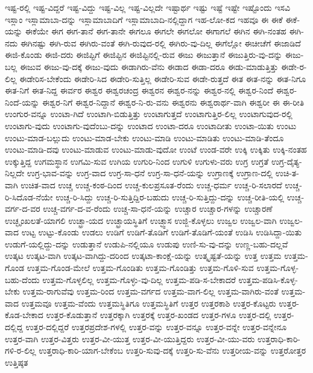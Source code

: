 {ಇಷ್ಟ-ರಲ್ಲಿ
ಇಷ್ಟ-ವಿದ್ದರೆ
ಇಷ್ಟ-ವಿದ್ದು
ಇಷ್ಟ-ವಿಲ್ಲ
ಇಷ್ಟ-ವಿಲ್ಲದೇ
ಇಷ್ಟಾರ್ಥ
ಇಷ್ಟು
ಇಷ್ಟೆ
ಇಷ್ಟೇ
ಇಷ್ಟೊಂದು
ಇಸವಿ
ಇಸ್ಲಾಂ
ಇಸ್ಲಾಮಾಬಾ-ದನ್ನು
ಇಸ್ಲಾಮಾಬಾದಿಗೆ
ಇಸ್ಲಾಮಾಬಾದಿ-ನಲ್ಲಿದ್ದಾಗ
ಇಹ-ಲೋ-ಕದ
ಇಹವೂ
ಈ
ಈಕೆ
ಈಕೆ-ಯನ್ನು
ಈಕೆಯೇ
ಈಗ
ಈಗ-ತಾನೆ
ಈಗ-ತಾನೇ
ಈಗಲೂ
ಈಗಲೇ
ಈಗಲೋ
ಈಗಾಗಲೆ
ಈಗಿನ
ಈಗಿ-ನಂತಹ
ಈಗಿ-ನದು
ಈಗಿನಷ್ಟು
ಈಗಿ-ರುವ
ಈಗಿರು-ವಂತೆ
ಈಗಿ-ರುವುದ-ರಲ್ಲಿ
ಈಗಿರು-ವು-ದಿಲ್ಲ
ಈಗೆಲ್ಲೋ
ಈಚೀಚೆಗೆ
ಈಜಾಡಿದೆ
ಈಜಿ-ಕೊಂಡು
ಈಜಿ-ದರು
ಈಜಿಪ್ಟಿಗೆ
ಈಜಿಪ್ಟಿನ
ಈಜಿಪ್ಟಿನಲ್ಲಿ-ರುವ
ಈಜು
ಈಜುತ್ತಾನೆ
ಈಜುತ್ತಿರು-ವು-ದನ್ನು
ಈಜು-ಬಲ್ಲ
ಈಜುವ
ಈಜು-ವು-ದಕ್ಕೆ
ಈಜು-ವುದು
ಈಡಾಗಿರು-ವೆನು
ಈಡಾದ
ಈಡಾ-ದರೂ
ಈಡು-ಮಾಡುತ್ತಿತ್ತು
ಈಡೇ-ರ-ಲಿಲ್ಲ
ಈಡೇರಿಸ-ಬೇಕೆಂದು
ಈಡೇರಿ-ಸಿದ
ಈಡೇರಿ-ಸುತ್ತಿಲ್ಲ
ಈಡೇರಿ-ಸುವ
ಈಡೇ-ರುತ್ತದೆ
ಈತ
ಈತ-ನನ್ನು
ಈತ-ನಿಗೂ
ಈತ-ನಿಗೆ
ಈತ-ನಿದ್ದ
ಈರ್ವರ
ಈಶ್ವರ
ಈಶ್ವರಚಂದ್ರ
ಈಶ್ವರನ
ಈಶ್ವರ-ನನ್ನು
ಈಶ್ವರ-ನಲ್ಲಿ
ಈಶ್ವರ-ನಿಂದೆ
ಈಶ್ವರ-ನಿಂದೆ-ಯನ್ನು
ಈಶ್ವರ-ನಿಗೆ
ಈಶ್ವರ-ನಿದ್ದಾನೆ
ಈಶ್ವರ-ನಿ-ರು-ವನು
ಈಶ್ವರನು
ಈಶ್ವರಾರ್ಥ-ವಾಗಿ
ಈಶ್ವರೀ
ಈ
ಈ-ರೀತಿ
ಉಂಗುರ-ವನ್ನೂ
ಉಂಟಾ-ಗಿದೆ
ಉಂಟಾಗಿ-ಬಿಡುತ್ತಿತ್ತು
ಉಂಟಾಗುತ್ತದೆ
ಉಂಟಾಗುತ್ತಿರ-ಲಿಲ್ಲ
ಉಂಟಾಗುವುದ-ರಲ್ಲಿ
ಉಂಟಾಗು-ವುದು
ಉಂಟಾಗು-ವುದೆಂಬು-ದನ್ನು
ಉಂಟಾದ
ಉಂಟಾ-ದರೂ
ಉಂಟಾದೀತು
ಉಂಟಾ-ಯಿತು
ಉಂಟು
ಉಂಟು-ಮಾಡ-ಬಲ್ಲುದು
ಉಂಟು-ಮಾಡ-ಬೇಕು
ಉಂಟು-ಮಾಡಿ
ಉಂಟು-ಮಾಡಿತು
ಉಂಟು-ಮಾಡಿ-ತೆಂದೂ
ಉಂಟು-ಮಾಡಿ-ದವು
ಉಂಟು-ಮಾಡುವ
ಉಂಟು-ಮಾಡು-ವುದೋ
ಉಂಟೆ
ಉಂಡ-ವರೇ
ಉಕ್ಕಿ
ಉಕ್ಕಿತು
ಉಕ್ಕಿ-ನಂತಹ
ಉಕ್ಕುತ್ತಿದ್ದ
ಉಗಮಸ್ಥಾನ
ಉಗಮಿ-ಸುವ
ಉಗಿಯ
ಉಗುರಿ-ನಿಂದ
ಉಗುಳಿ
ಉಗುಳು-ವರು
ಉಗ್ರ
ಉಗ್ರತೆ
ಉಗ್ರ-ದೈತ್ಯ-ನಿಲ್ಲದೇ
ಉಗ್ರ-ಭಾವ-ವನ್ನು
ಉಗ್ರ-ವಾದ
ಉಗ್ರ-ಸಾ-ಧನೆ
ಉಗ್ರ-ಸಾ-ಧನೆ-ಯನ್ನು
ಉಗ್ರಾಣಕ್ಕೆ
ಉಗ್ರಾಣ-ದಲ್ಲಿ
ಉಚಿ-ತ-ವಾಗಿ
ಉಚಿತ-ವಾದ
ಉಚ್ಚ
ಉಚ್ಚ-ಕಂಠ-ದಿಂದ
ಉಚ್ಚ-ಕುಲಪ್ರಸೂತ-ರೆಂದು
ಉಚ್ಚ-ಧರ್ಮ
ಉಚ್ಚ-ರಿ-ಸಲಾರದೆ
ಉಚ್ಚ-ರಿ-ಸಿದೊಡ-ನೆಯೇ
ಉಚ್ಚ-ರಿ-ಸಿದ್ದು
ಉಚ್ಚ-ರಿ-ಸುತ್ತಿದ್ದಿರ-ಬಹುದು
ಉಚ್ಚ-ರಿ-ಸುತ್ತಿದ್ದು-ದನ್ನು
ಉಚ್ಚ-ರೀತಿ-ಯಲ್ಲಿ
ಉಚ್ಚ-ವರ್ಗ-ದ-ವರ
ಉಚ್ಚ-ವರ್ಗ-ದ-ವ-ರೆಂದು
ಉಚ್ಚ-ಸಾ-ಧನೆ-ಯನ್ನು
ಉಚ್ಚಾರ
ಉಚ್ಚಾರ-ಗಳನ್ನು
ಉಚ್ಚಾರಣೆ
ಉಚ್ಛೃಂಖಲತೆ-ಯಾಗಲಿ
ಉಚ್ಛ್ರಾ-ಯದ
ಉಚ್ಛ್ರಾಯಸ್ಥಿತಿಗೆ
ಉಚ್ಛ್ವಾಸ
ಉಜ್ಜಿ-ಕೊಳ್ಳಲು
ಉಜ್ವಲ
ಉಜ್ವಲ-ವಾಗಿ
ಉಜ್ವಲ-ವಾದ
ಉಟ್ಟ
ಉಟ್ಟು-ಕೊಂಡು
ಉಡಲು
ಉಡಿಗೆ
ಉಡಿಗೆ-ತೊಡಿಗೆ
ಉಡಿಗೆ-ತೊಡಿಗೆ-ಯಂತೆ
ಉಡಿಸಿ
ಉಡಿಸಿದ್ದಾ-ಯಿತು
ಉಡುಗೆ-ಯಲ್ಲಿದ್ದು-ದನ್ನು
ಉಡುತ್ತಾನೆ
ಉಡುಪಿ-ನಲ್ಲಿಯೂ
ಉಡುಪು
ಉಣಿ-ಸು-ವು-ದನ್ನು
ಉಣ್ಣ-ಬಹು-ದಲ್ಲವೆ
ಉತ್ಕಟ
ಉತ್ಕಟ-ವಾಗಿ
ಉತ್ಕಟ-ವಾಗಿದ್ದು-ದರಿಂದ
ಉತ್ಕಟಾ-ಕಾಂಕ್ಷೆ-ಯನ್ನು
ಉತ್ಕೃಷ್ಟತೆ-ಯನ್ನು
ಉತ್ತ
ಉತ್ತಮ
ಉತ್ತಮ-ಗೊಂಡ
ಉತ್ತಮ-ಗೊಂಡ-ಮೇಲೆ
ಉತ್ತಮ-ಗೊಂಡಿತು
ಉತ್ತಮ-ಗೊಂಡಿತ್ತು
ಉತ್ತಮ-ಗೊಳಿ-ಸುವ
ಉತ್ತಮ-ಗೊಳ್ಳ-ಬಹು-ದೆಂದು
ಉತ್ತಮ-ಗೊಳ್ಳಲಿಲ್ಲ
ಉತ್ತಮ-ಗೊಳ್ಳು-ವು-ದಿಲ್ಲ
ಉತ್ತಮ-ಪಡಿ-ಸ-ಬೇಕಾದರೆ
ಉತ್ತಮ-ಪಡಿಸಿ-ಕೊಳ್ಳ-ಬೇಕು
ಉತ್ತಮ-ರಾಗುವೆವು
ಉತ್ತಮ-ರಿಂದ
ಉತ್ತಮ-ವರ್ಗದ
ಉತ್ತಮ-ವಾಗ-ಲಿಲ್ಲ
ಉತ್ತಮ-ವಾಗಿರು-ವಂತೆ
ಉತ್ತಮ-ವಾದ
ಉತ್ತಮವೂ
ಉತ್ತಮ-ವೆಂದು
ಉತ್ತಮಸ್ಥಿತಿಗೂ
ಉತ್ತಮಸ್ಥಿತಿಗೆ
ಉತ್ತರ
ಉತ್ತರಕಾಶಿ
ಉತ್ತರ-ಕೊಟ್ಟರು
ಉತ್ತರ-ಕೊಡ-ಬೇಕಾದ
ಉತ್ತರ-ಕೊಡುತ್ತಾನೆ
ಉತ್ತರಕ್ಕಾಗಿ
ಉತ್ತರಕ್ಕೆ
ಉತ್ತರ-ಖಂಡದ
ಉತ್ತರ-ಗಳೂ
ಉತ್ತರ-ದಲ್ಲಿ
ಉತ್ತರ-ದಲ್ಲಿದ್ದ
ಉತ್ತರ-ದಲ್ಲಿದ್ದರೆ
ಉತ್ತರಪ್ರದೇಶ-ಗಳಲ್ಲಿ
ಉತ್ತರ-ವನ್ನು
ಉತ್ತರ-ವನ್ನೂ
ಉತ್ತರ-ವನ್ನೇ
ಉತ್ತರ-ವನ್ನೇನೂ
ಉತ್ತರ-ವಾಗಿ
ಉತ್ತರ-ವಿತ್ತರು
ಉತ್ತರ-ವೀ-ಯುತ್ತ
ಉತ್ತರ-ವೀ-ಯುತ್ತಿದ್ದರು
ಉತ್ತರ-ವೀ-ಯು-ವರು
ಉತ್ತರಾಧಿ-ಕಾರಿ-ಗಳಿ-ರ-ಲಿಲ್ಲ
ಉತ್ತರಾಧಿ-ಕಾರಿ-ಯಾಗ-ಬೇಕೆಂಬ
ಉತ್ತರಿ-ಸುವು-ದಕ್ಕೆ
ಉತ್ತರಿ-ಸು-ವೆನು
ಉತ್ತರೀಯ-ವನ್ನು
ಉತ್ತರೋತ್ತರ
ಉತ್ತಿಷ್ಠತ
}
